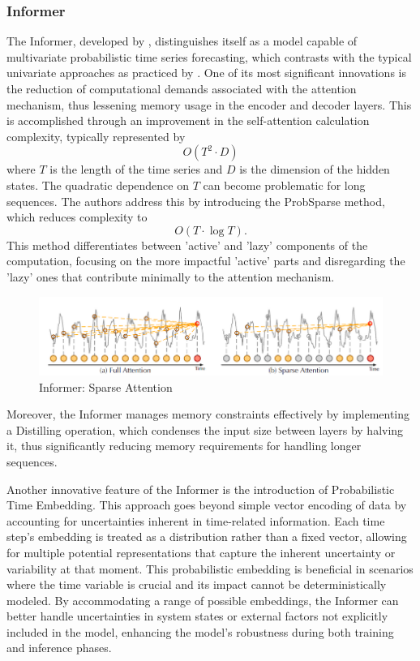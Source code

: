 \documentclass{article}
\begin{document}
\subsubsection{Informer}

The Informer, developed by \cite{Informer}, distinguishes itself as a model capable of multivariate probabilistic time series forecasting, which contrasts with the typical univariate approaches as practiced by \cite{transformer_univariate_forecasting}. One of its most significant innovations is the reduction of computational demands associated with the attention mechanism, thus lessening memory usage in the encoder and decoder layers. This is accomplished through an improvement in the self-attention calculation complexity, typically represented by
\begin{equation*}
    O(T^2 \cdot D)
\end{equation*}
where $T$ is the length of the time series and $D$ is the dimension of the hidden states. The quadratic dependence on $T$ can become problematic for long sequences. The authors address this by introducing the ProbSparse method, which reduces complexity to
\begin{equation*}
    O(T \cdot \log{T}) .
\end{equation*}
This method differentiates between 'active' and 'lazy' components of the computation, focusing on the more impactful 'active' parts and disregarding the 'lazy' ones that contribute minimally to the attention mechanism.

\begin{figure}
    \centering
    \includegraphics[width=\linewidth]{graphs/models/Sparse_Attention_Example.png}
    \caption{Informer: Sparse Attention}
    \label{fig:enter-label}
\end{figure}

Moreover, the Informer manages memory constraints effectively by implementing a Distilling operation, which condenses the input size between layers by halving it, thus significantly reducing memory requirements for handling longer sequences.

Another innovative feature of the Informer is the introduction of Probabilistic Time Embedding. This approach goes beyond simple vector encoding of data by accounting for uncertainties inherent in time-related information. Each time step's embedding is treated as a distribution rather than a fixed vector, allowing for multiple potential representations that capture the inherent uncertainty or variability at that moment. This probabilistic embedding is beneficial in scenarios where the time variable is crucial and its impact cannot be deterministically modeled. By accommodating a range of possible embeddings, the Informer can better handle uncertainties in system states or external factors not explicitly included in the model, enhancing the model’s robustness during both training and inference phases.
\end{document}

